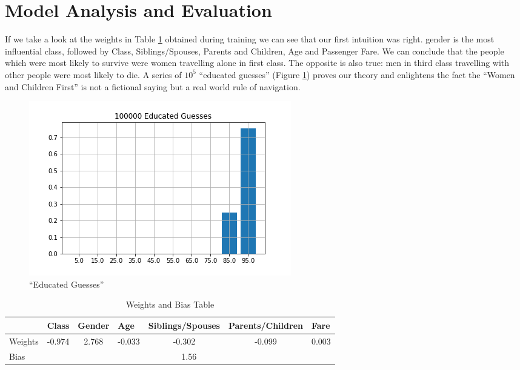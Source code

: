 \documentclass[10pt,a4paper]{report}
\begin{document}
\section{Model Analysis and Evaluation}
If we take a look at the weights in Table \ref{tab:1} obtained during training we can see that our first intuition was right. gender is the most influential class, followed by Class, Siblings/Spouses, Parents and Children, Age and Passenger Fare. We can conclude that the people which were most likely to survive were women travelling alone in first class. The opposite is also true: men in third class travelling with other people were most likely to die. A series of $10^5$ \enquote{educated guesses} (Figure \ref{fig:ed_guess}) proves our theory and enlightens the fact the \enquote{Women and Children First} is not a fictional saying but a real world rule of navigation.
\begin{figure}[!ht]
\centering
\includegraphics[width=0.5\linewidth]{ed_guess.png}
\caption{\enquote{Educated Guesses}}
\label{fig:ed_guess}
\end{figure}
\begin{table}[!ht]
\centering
\begin{tabular}{|l|c|l|l|l|l|l|}
\hline
        & \multicolumn{1}{l|}{Class} & Gender                     & Age                         & Siblings/Spouses            & Parents/Children            & Fare                       \\ \hline
Weights & -0.974                     & \multicolumn{1}{c|}{2.768} & \multicolumn{1}{c|}{-0.033} & \multicolumn{1}{c|}{-0.302} & \multicolumn{1}{c|}{-0.099} & \multicolumn{1}{c|}{0.003} \\ \hline
Bias    & \multicolumn{6}{c|}{1.56}                                                                                                                                                      \\ \hline
\end{tabular}
\caption{Weights and Bias Table}
\label{tab:1}
\end{table} 
\end{document}

